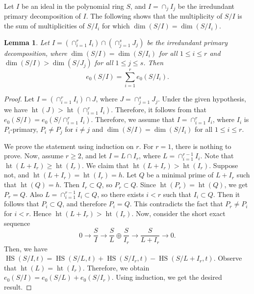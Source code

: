 \documentclass[12pt,reqno]{amsart}
\newcommand \hs{\operatorname{HS}}
\newcommand \h{\operatorname{ht}}
\DeclareMathOperator{\height}{ht}
\theoremstyle{plain}
\newtheorem{lemma}[theorem]{Lemma}
\theoremstyle{definition}
\begin{document}
Let $I$ be an ideal in the polynomial ring $S$, and $I=\cap_j I_j$ be the irredundant primary decomposition of $I$. The following shows that the multiplicity of $S/I$ is the sum of multiplicities of $S/I_i$ for which $\dim(S/I)=\dim(S/I_i)$. 
\begin{lemma}\label{lemma: multiplicity of arbitrary ideal}
    Let $I=(\cap_{i=1}^rI_i)\cap(\cap_{j=1}^sJ_j)$ be the irredundant primary decomposition, where $\dim(S/I)=\dim(S/I_i)$ for all $1\leq i\leq r$ and $\dim(S/I)>\dim(S/J_j)$ for all $1\leq j\leq s$. Then $$e_0(S/I)=\sum_{i=1}^r e_0(S/I_i).$$ 
\end{lemma}
\begin{proof}
Let $I=(\cap_{i=1}^rI_i)\cap J$, where $J=\cap_{j=1}^sJ_j$. Under the given hypothesis, we have $\h(J)>\h(\cap_{i=1}^rI_i)$. Therefore, it follows from \cite[Lemma 3.1]{KKP-Hilbert-coefficients-regularity-BEI} that $e_0(S/I)=e_0(S/{\cap_{i=1}^r I_i})$. Therefore, we assume that $I=\cap_{i=1}^rI_i$, where $I_i$ is $P_i$-primary, $P_i\neq P_j$ for $i\neq j$ and $\dim(S/I)=\dim(S/I_i)$ for all $1\leq i\leq r$. 

We prove the statement using induction on $r$. For $r=1$, there is nothing to prove. Now, assume $r\geq2$, and let $I=L\cap I_r$, where $L=\cap_{i=1}^{r-1}I_i$. Note that $\height(L+I_r)\geq \height(I_r)$.  We claim that $\height(L+I_r)>\height(I_r).$ Suppose not, and $\height(L+I_r)=\height(I_r)=h$. Let $Q$ be a minimal prime of $L+I_r$ such that $\height(Q)=h$. Then $I_r\subset Q$, so $P_r\subset Q$. Since $\height(P_r)=\height(Q)$, we get $P_r=Q$. Also $L=\cap_{i=1}^{r-1}I_i\subset Q$, so there exists $i<r$ such that $I_i\subset Q$. Then it follows that $P_i\subset Q$, and therefore $P_i=Q$. This contradicts the fact that $P_r\neq P_i$ for $i<r$. Hence $\height(L+I_r)>\height(I_r).$ Now, consider the short exact sequence \[ 0\rightarrow{\frac{S}{I}}\rightarrow \frac{S}{L}\oplus \frac{S}{I_r}\rightarrow \frac{S}{L+I_r}\rightarrow 0.\] Then, we have $\hs(S/I,t)=\hs(S/L,t)+\hs(S/I_r,t)-\hs(S/L+I_r,t)$. Observe that $\height(L)=\height(I_r)$. Therefore, we obtain $e_0(S/I)=e_0(S/L)+e_0(S/I_r)$. Using induction, we get the desired result.
\end{proof}
\end{document}
